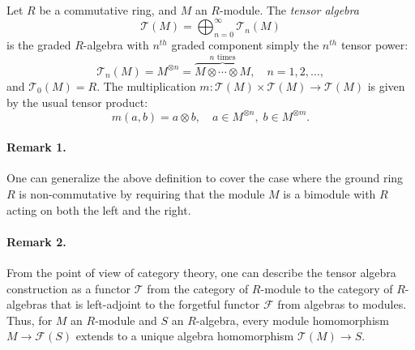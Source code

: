 \documentclass[12pt]{article}
\newcommand{\mc}[1]{\mathcal{#1}}
\begin{document}
Let $R$ be a commutative ring, and $M$ an $R$-module.
The \emph{tensor algebra}
\[ \mc{T}(M) = \bigoplus_{n=0}^\infty \mc{T}_n(M)\]
is the  graded $R$-algebra with $n^{th}$
graded component simply the $n^{th}$ tensor power:
\[ \mc{T}_n(M) = M^{\otimes n} =\overbrace{M\otimes \cdots \otimes
  M}^{n\text{ times}},\quad n=1,2,\ldots,\]
and $\mc{T}_0(M)=R$.
The multiplication $m:\mc{T}(M)\times \mc{T}(M)\to\mc{T}(M)$ is given
by the usual tensor product: 
\[ m(a,b)=a\otimes b,\quad a\in M^{\otimes n},\; b\in M^{\otimes m}.\]

\paragraph{Remark 1.} One can  generalize the above definition to
cover the case where the ground ring $R$ is non-commutative by
requiring that the module $M$ is a bimodule with $R$ acting on both
the left and the right.


\paragraph{Remark 2.} From the point of view of category theory, one
can describe the tensor algebra construction as  a functor $\mc{T}$
from the category of $R$-module to the category of $R$-algebras that
is left-adjoint to the forgetful functor $\mc{F}$ from algebras to
modules.  Thus, for $M$ an $R$-module and $S$ an $R$-algebra, every
module homomorphism $M\to \mc{F}(S)$ extends to a unique algebra
homomorphism $\mc{T}(M)\to S$.
\end{document}
